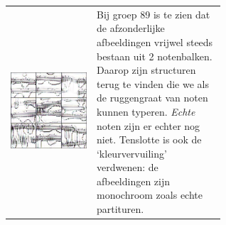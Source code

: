 \documentclass[dutch, twoside, a4paper, 10pt]{article}
\begin{document}
\begin{table}[H]
\begin{tabular}{c p{0.6\linewidth}}
          \includegraphics[scale=0.18]{89.jpg} & \vspace{-10\baselineskip} Bij groep 89 is te zien dat de afzonderlijke afbeeldingen vrijwel steeds bestaan uit 2 notenbalken. Daarop zijn structuren terug te vinden die we als de ruggengraat van noten kunnen typeren. \textit{Echte} noten zijn er echter nog niet. Tenslotte is ook de `kleurvervuiling' verdwenen: de afbeeldingen zijn monochroom zoals echte partituren.\\

\end{tabular}
\end{table}
\end{document}
